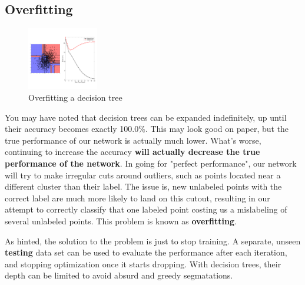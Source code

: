 \documentclass{article}
\begin{document}
\subsection{Overfitting}
\begin{figure}
  \begin{center}
    \vspace{-45pt}
    \includegraphics[width=0.275\textwidth]{overfit.png}
    \vspace{-40pt}
  \end{center}
  \caption{Overfitting a decision tree}
  \vspace{-10pt}
\end{figure}
You may have noted that decision trees can be expanded indefinitely, up until their accuracy becomes exactly 100.0\%. This may look good on paper, but the true performance of our network is actually much lower. What's worse, continuing to increase the accuracy \textbf{will actually decrease the true performance of the network}. In going for "perfect performance", our network will try to make irregular cuts around outliers, such as points located near a different cluster than their label. The issue is, new unlabeled points with the correct label are much more likely to land on this cutout, resulting in our attempt to correctly classify that one labeled point costing us a mislabeling of several unlabeled points. This problem is known as \textbf{overfitting}.

As hinted, the solution to the problem is just to stop training. A separate, unseen \textbf{testing} data set can be used to evaluate the performance after each iteration, and stopping optimization once it starts dropping. With decision trees, their depth can be limited to avoid absurd and greedy segmatations.
\end{document}
